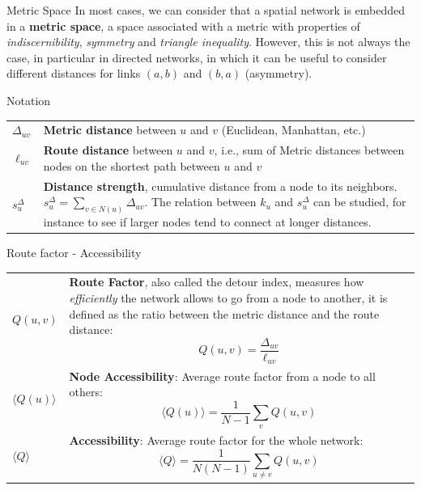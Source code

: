 \documentclass[a4paper,11pt]{book}
\begin{document}
\begin{textbox}{Metric Space}
In most cases, we can consider that a spatial network is embedded in a \textbf{metric space}, a space associated with a metric with properties of \textit{indiscernibility}, \textit{symmetry} and \textit{triangle inequality}. However, this is not always the case, in particular in directed networks, in which it can be useful to consider different distances for links $(a,b)$ and $(b,a)$ (asymmetry). 


\end{textbox}



\begin{textbox}{Notation}
\begin{tabular}{p{}|p{}}\scriptsize
$\Delta_{uv}$ & \textbf{Metric distance} between $u$ and $v$ (Euclidean, Manhattan, etc.)\\
$\ell_{uv}$ & \textbf{Route distance} between $u$ and $v$, i.e., sum of Metric distances between nodes on the shortest path between $u$ and $v$\\
$s_u^\Delta$ & \textbf{Distance strength}, cumulative distance from a node to its neighbors. $s_u^\Delta=\sum_{v \in N(u)}\Delta_{uv}$. The relation between $k_u$ and $s_u^\Delta$ can be studied, for instance to see if larger nodes tend to connect at longer distances.

\end{tabular}


\end{textbox}



\begin{textbox}{Route factor - Accessibility}

\begin{tabular}{p{}|p{}}\scriptsize
$Q(u,v)$ & \textbf{Route Factor}, also called the detour index, measures how \textit{efficiently} the network allows to go from a node to another, it is defined as the ratio between the metric distance and the route distance: \[Q(u,v)=\frac{\Delta_{uv}}{\ell_{uv}}\] \\
$\langle Q(u)\rangle$ & \textbf{Node Accessibility}: Average route factor from a node to all others: \[\langle Q(u)\rangle=\frac{1}{N-1}\sum_v Q(u,v)\]\\
$\langle Q\rangle$ & \textbf{Accessibility}: Average route factor for the whole network: \[\langle Q\rangle=\frac{1}{N(N-1)}\sum_{u\neq v} Q(u,v)\]\\
\end{tabular}

\end{textbox}
\end{document}
